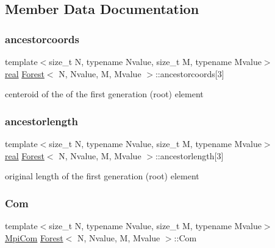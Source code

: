 \subsection{Member Data Documentation}
\mbox{\label{classForest_a674b25321e648195b85e743c431a48d8}} 
\subsubsection{\texorpdfstring{ancestorcoords}{ancestorcoords}}
{\footnotesize\ttfamily template$<$size\+\_\+t N, typename Nvalue, size\+\_\+t M, typename Mvalue$>$ \\
\mbox{\hyperlink{definitions_8h_aedc0ad84d1e764530814f57ad931d02a}{real}} \mbox{\hyperlink{classForest}{Forest}}$<$ N, Nvalue, M, Mvalue $>$\+::ancestorcoords\mbox{[}3\mbox{]}\hspace{0.3cm}{\ttfamily [protected]}}

centeroid of the of the first generation (root) element \mbox{\label{classForest_a2891766e220c4e742c8dc14ac1ece629}} 
\subsubsection{\texorpdfstring{ancestorlength}{ancestorlength}}
{\footnotesize\ttfamily template$<$size\+\_\+t N, typename Nvalue, size\+\_\+t M, typename Mvalue$>$ \\
\mbox{\hyperlink{definitions_8h_aedc0ad84d1e764530814f57ad931d02a}{real}} \mbox{\hyperlink{classForest}{Forest}}$<$ N, Nvalue, M, Mvalue $>$\+::ancestorlength\mbox{[}3\mbox{]}\hspace{0.3cm}{\ttfamily [protected]}}

original length of the first generation (root) element \mbox{\label{classForest_a99577d96bafe893570546d8eb6c00078}} 
\subsubsection{\texorpdfstring{Com}{Com}}
{\footnotesize\ttfamily template$<$size\+\_\+t N, typename Nvalue, size\+\_\+t M, typename Mvalue$>$ \\
\mbox{\hyperlink{structMpiCom}{Mpi\+Com}} \mbox{\hyperlink{classForest}{Forest}}$<$ N, Nvalue, M, Mvalue $>$\+::Com\hspace{0.3cm}{\ttfamily [private]}}

